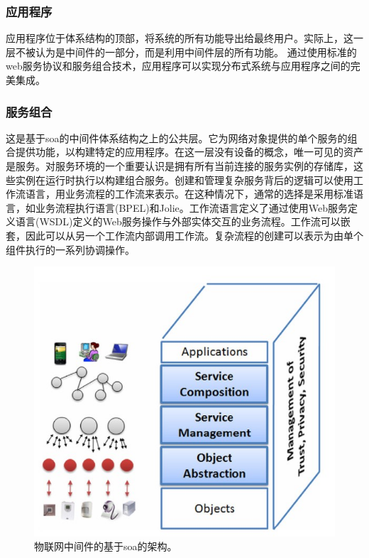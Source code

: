\documentclass[12pt,a4paper]{article}%
\begin{document}
\subsubsection{应用程序}
应用程序位于体系结构的顶部，将系统的所有功能导出给最终用户。实际上，这一层不被认为是中间件的一部分，而是利用中间件层的所有功能。
通过使用标准的web服务协议和服务组合技术，应用程序可以实现分布式系统与应用程序之间的完美集成。
\subsubsection{服务组合}
这是基于soa的中间件体系结构之上的公共层。它为网络对象提供的单个服务的组合提供功能，以构建特定的应用程序。在这一层没有设备的概念，唯一可见的资产是服务。对服务环境的一个重要认识是拥有所有当前连接的服务实例的存储库，这些实例在运行时执行以构建组合服务。创建和管理复杂服务背后的逻辑可以使用工作流语言，用业务流程的工作流来表示。在这种情况下，通常的选择是采用标准语言，如业务流程执行语言(BPEL)和Jolie。工作流语言定义了通过使用Web服务定义语言(WSDL)定义的Web服务操作与外部实体交互的业务流程。工作流可以嵌套，因此可以从另一个工作流内部调用工作流。复杂流程的创建可以表示为由单个组件执行的一系列协调操作。

\begin{figure}[H]%
	\centering
	\begin{minipage}{0.6\textwidth}%
		\centering
		\includegraphics[width=1.0%
		\textwidth]{fig3.jpg}%
		\caption{\fontsize{10pt}{15pt}\selectfont 物联网中间件的基于soa的架构。}%
	\end{minipage}
\end{figure}
\end{document}
